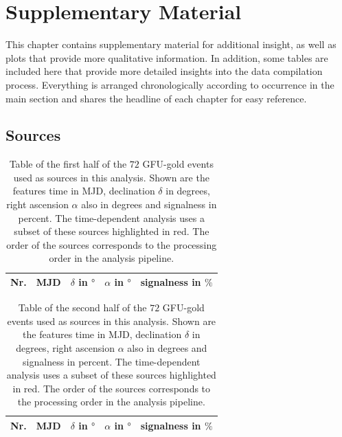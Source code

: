 \chapter{Supplementary Material} \label{sec:appendix}

This chapter contains supplementary material for additional insight, as well as plots that provide more qualitative information.
In addition, some tables are included here that provide more detailed insights into the data compilation process.
Everything is arranged chronologically according to occurrence in the main section and shares the headline of each chapter for easy reference.

\section{Sources}

\begin{table}
  \centering
  \caption{Table of the first half of the $\num{72}$ GFU-gold events used as sources in this analysis. Shown are the features time in MJD, declination $\delta$ in degrees, right ascension $\alpha$ also in degrees and signalness in percent. The time-dependent analysis uses a subset of these sources highlighted in red. The order of the sources corresponds to the processing order in the analysis pipeline.}
  \label{tab:sources_v2}
  \begin{tabular}{ccrrc}
    \toprule
    Nr. & MJD &  $\delta$ in $\si{\degree}$ & $\alpha$ in $\si{\degree}$ & signalness in $\si{\percent}$ \\
    \toprule
      
    \toprule
  \end{tabular}
\end{table}

\begin{table}
  \centering
  \caption{Table of the second half of the $\num{72}$ GFU-gold events used as sources in this analysis. Shown are the features time in MJD, declination $\delta$ in degrees, right ascension $\alpha$ also in degrees and signalness in percent. The time-dependent analysis uses a subset of these sources highlighted in red. The order of the sources corresponds to the processing order in the analysis pipeline.}
  \label{tab:sources_v2_2}
  \begin{tabular}{ccrrc}
    \toprule
    Nr. & MJD &  $\delta$ in $\si{\degree}$ & $\alpha$ in $\si{\degree}$ & signalness in $\si{\percent}$ \\
    \toprule
      
    \toprule
  \end{tabular}
\end{table}

